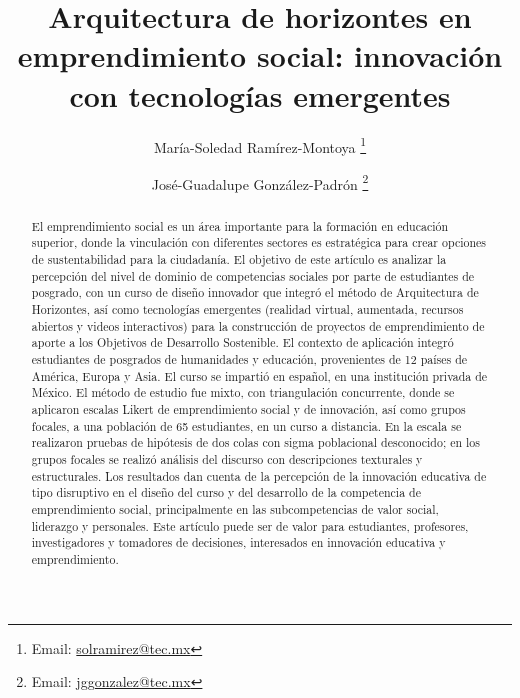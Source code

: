\documentclass[spanish]{textolivre}
\title{Arquitectura de horizontes en emprendimiento social: innovación con tecnologías emergentes}
\author[1]{María-Soledad Ramírez-Montoya \orcid{0000-0002-1274-706X} \thanks{Email: \url{solramirez@tec.mx}}}
\author[1]{José-Guadalupe González-Padrón \orcid{0000-0002-7942-744X} \thanks{Email: \url{jggonzalez@tec.mx}}}
\affil[1]{Tecnologico de Monterrey, School of Humanities and Education, Monterrey, Nuevo León, Mexico.}
\begin{document}
\maketitle

\begin{polyabstract}
\begin{abstract}
El emprendimiento social es un área importante para la formación en educación superior, donde la vinculación con diferentes sectores es estratégica para crear opciones de sustentabilidad para la ciudadanía. El objetivo de este artículo es analizar la percepción del nivel de dominio de competencias sociales por parte de estudiantes de posgrado, con un curso de diseño innovador que integró el método de Arquitectura de Horizontes, así como tecnologías emergentes (realidad virtual, aumentada, recursos abiertos y videos interactivos) para la construcción de proyectos de emprendimiento de aporte a los Objetivos de Desarrollo Sostenible. El contexto de aplicación integró estudiantes de posgrados de humanidades y educación, provenientes de 12 países de América, Europa y Asia. El curso se impartió en español, en una institución privada de México. El método de estudio fue mixto, con triangulación concurrente, donde se aplicaron escalas Likert de emprendimiento social y de innovación, así como grupos focales, a una población de 65 estudiantes, en un curso a distancia. En la escala se realizaron pruebas de hipótesis de dos colas con sigma poblacional desconocido; en los grupos focales se realizó análisis del discurso con descripciones texturales y estructurales. Los resultados dan cuenta de la percepción de la innovación educativa de tipo disruptivo en el diseño del curso y del desarrollo de la competencia de emprendimiento social, principalmente en las subcompetencias de valor social, liderazgo y personales. Este artículo puede ser de valor para estudiantes, profesores, investigadores y tomadores de decisiones, interesados en innovación educativa y emprendimiento.

\end{abstract}


\end{polyabstract}
\end{document}
